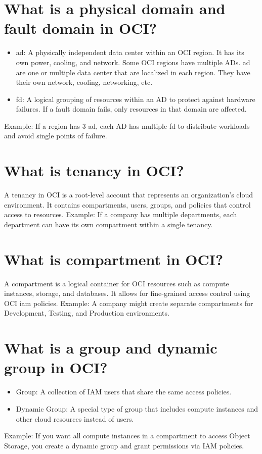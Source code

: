 \documentclass[../main.tex]{subfiles}
\begin{document}
\section{What is a physical domain and fault domain in OCI?}
\begin{itemize}
  \item {\acrfull{ad}: A physically independent data center within an OCI region. 
      It has its own power, cooling, and network. Some OCI regions have multiple ADs.
      \acrshort{ad} are one or multiple data center that are localized in each region.
      They have their own network, cooling, networking, etc.
    }
  \item {\acrfull{fd}: A logical grouping of resources within an AD to protect against hardware failures.
    If a fault domain fails, only resources in that domain are affected.}
\end{itemize}
Example: If a region has 3 \acrlong{ad}, each AD has multiple \acrlong{fd} to distribute workloads and avoid single points of failure.

\section{What is tenancy in OCI?}
A tenancy in OCI is a root-level account that represents an organization’s cloud environment.
It contains compartments, users, groups, and policies that control access to resources.
Example: If a company has multiple departments, each department can have its own compartment within a single tenancy.

\section{What is compartment in OCI?}
A compartment is a logical container for OCI resources such as compute instances, storage, and databases.
It allows for fine-grained access control using OCI \acrfull{iam} policies.
Example: A company might create separate compartments for Development, Testing, and Production environments.

\section{What is a group and dynamic group in OCI?}
\begin{itemize}
  \item Group: A collection of IAM users that share the same access policies.
  \item Dynamic Group: A special type of group that includes compute instances and other cloud resources instead of users.
\end{itemize}
Example: If you want all compute instances in a compartment to access Object Storage, you create a dynamic group and grant permissions via IAM policies.
\end{document}
